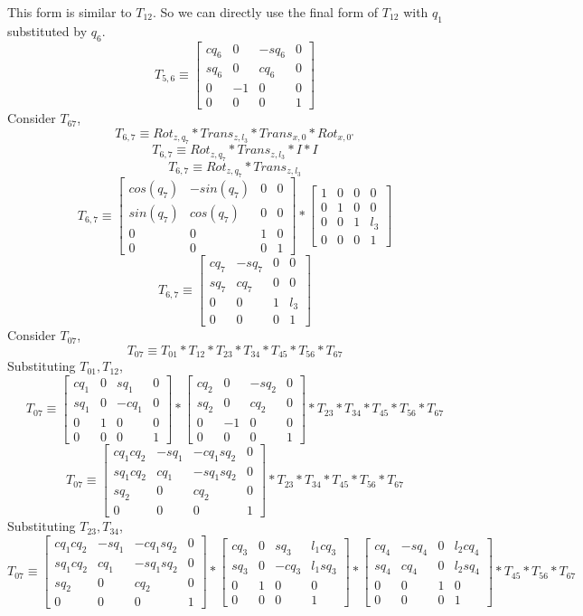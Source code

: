 \documentclass[12pt]{article}
\newcommand{\rz}[1]{\begin{bmatrix} cos(#1) & -sin(#1) & 0 & 0 \\ sin(#1) & cos(#1) & 0 & 0 \\ 0 & 0 & 1 & 0 \\ 0 & 0 & 0 & 1 \end{bmatrix}}
\newcommand{\trans}[3]{\begin{bmatrix} 1 & 0 & 0 & #1 \\ 0 & 1 & 0 & #2 \\ 0 & 0 & 1 & #3 \\ 0 & 0 & 0 & 1 \end{bmatrix}}
\begin{document}
This form is similar to $T_{12}$. So we can directly use the final form of $T_{12}$ with $q_1$ substituted by $q_6$.
\[
  T_{5,6} \equiv
  \begin{bmatrix} cq_6 & 0 & -sq_6 & 0 \\ sq_6 & 0 & cq_6 & 0 \\ 0 & -1 & 0 & 0 \\ 0 & 0 & 0 & 1 \end{bmatrix}
\]
Consider $T_{67}$,
\[
  T_{6,7} \equiv Rot_{z,q_7} * Trans_{z, l_3} * Trans_{x, 0} * Rot_{x, 0^{\circ}}
\]
\[
  T_{6,7} \equiv Rot_{z,q_7} * Trans_{z, l_3} * I * I
\]
\[
  T_{6,7} \equiv Rot_{z,q_7} * Trans_{z, l_3}
\]
\[
  T_{6,7} \equiv \rz{q_7} * \trans{0}{0}{l_3}
\]
\[
  T_{6,7} \equiv
  \begin{bmatrix} cq_7 & -sq_7 & 0 & 0 \\ sq_7 & cq_7 & 0 & 0 \\ 0 & 0 & 1 & l_3 \\ 0 & 0 & 0 & 1 \end{bmatrix}
\]
Consider $T_{07}$,
\[
  T_{07} \equiv
  T_{01}
  * T_{12}
  * T_{23}
  * T_{34}
  * T_{45}
  * T_{56}
  * T_{67}
\]
Substituting $T_{01}, T_{12}$,
\[
  T_{07} \equiv
  \begin{bmatrix} cq_1 & 0 & sq_1 & 0 \\ sq_1 & 0 & -cq_1 & 0 \\ 0 & 1 & 0 & 0 \\ 0 & 0 & 0 & 1 \end{bmatrix}
  * \begin{bmatrix} cq_2 & 0 & -sq_2 & 0 \\ sq_2 & 0 & cq_2 & 0 \\ 0 & -1 & 0 & 0 \\ 0 & 0 & 0 & 1 \end{bmatrix}
  * T_{23}
  * T_{34}
  * T_{45}
  * T_{56}
  * T_{67}
\]
\[
  T_{07} \equiv
  \begin{bmatrix} cq_1cq_2 & -sq_1 & -cq_1sq_2 & 0 \\ sq_1cq_2 & cq_1 & -sq_1sq_2 & 0 \\ sq_2 & 0 & cq_2 & 0 \\ 0 & 0 & 0 & 1 \end{bmatrix}
  * T_{23}
  * T_{34}
  * T_{45}
  * T_{56}
  * T_{67}
\]
Substituting $T_{23}, T_{34}$,
\[
  T_{07} \equiv
  \begin{bmatrix} cq_1cq_2 & -sq_1 & -cq_1sq_2 & 0 \\ sq_1cq_2 & cq_1 & -sq_1sq_2 & 0 \\ sq_2 & 0 & cq_2 & 0 \\ 0 & 0 & 0 & 1 \end{bmatrix}
  * \begin{bmatrix} cq_3 & 0 & sq_3 & l_1cq_3 \\ sq_3 & 0 & -cq_3 & l_1sq_3 \\ 0 & 1 & 0 & 0 \\ 0 & 0 & 0 & 1 \end{bmatrix}
  * \begin{bmatrix} cq_4 & -sq_4 & 0 & l_2cq_4 \\ sq_4 & cq_4 & 0 & l_2sq_4 \\ 0 & 0 & 1 & 0 \\ 0 & 0 & 0 & 1 \end{bmatrix}
  * T_{45}
  * T_{56}
  * T_{67}
\]
\end{document}
